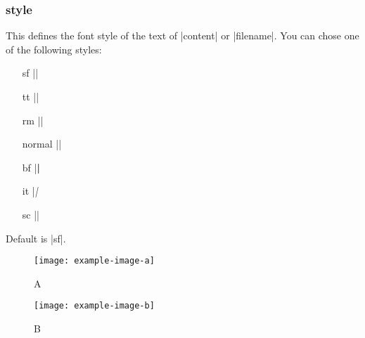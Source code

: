 \documentclass[a4paper,
10pt,
english
]{ltxdoc}
\begin{document}
\subsubsection{style}
 This defines the font style of the text of |content| or |filename|. 
You can chose one of the following styles: 
\begin{multicols}{3}
\begin{itemize}
	\item[sf] |\sffamily|
	\item[tt] |\ttfamily|
	\item[rm] |\rmfamily|
	\item[normal] |\normalfont|
	\item[bf] |\bfseries|
	\item[it] |\itshape|
	\item[sc] |\scshape|
\end{itemize}
\end{multicols}
Default is |sf|.
\begin{code}
\usepackage[%
  content={hidden image},
  style = {bf},%
  ]{draftfigure}
\end{code}
\begin{examplebox}
\begin{figure}[H]
  \centering
  \texttt{[image: example-image-a]}
  \caption{A}
  \texttt{[image: example-image-b]}
  \caption{B}
\end{figure}
\end{examplebox}
\clearpage
\end{document}

